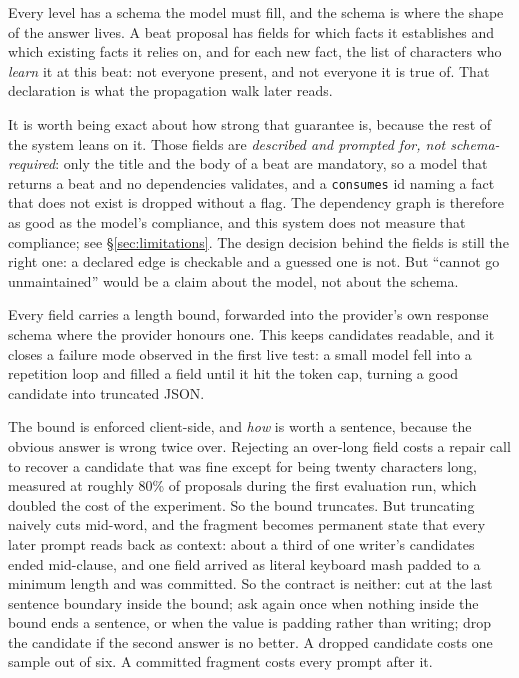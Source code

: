 \documentclass{article}
\begin{document}
Every level has a schema the model must fill, and the schema is where the shape of the
answer lives. A beat proposal has fields for which facts it establishes and which existing
facts it relies on, and for each new fact, the list of characters who \emph{learn} it at
this beat: not everyone present, and not everyone it is true of. That declaration is what
the propagation walk later reads.

It is worth being exact about how strong that guarantee is, because the rest of the system
leans on it. Those fields are \emph{described and prompted for, not schema-required}: only
the title and the body of a beat are mandatory, so a model that returns a beat and no
dependencies validates, and a \texttt{consumes} id naming a fact that does not exist is
dropped without a flag. The dependency graph is therefore as good as the model's
compliance, and this system does not measure that compliance; see
\S\ref{sec:limitations}. The design decision behind the fields is still the right one: a
declared edge is checkable and a guessed one is not. But ``cannot go unmaintained'' would
be a claim about the model, not about the schema.

Every field carries a length bound, forwarded into the provider's own response schema where
the provider honours one. This keeps candidates readable, and it closes a failure mode
observed in the first live test: a small model fell into a repetition loop and filled a
field until it hit the token cap, turning a good candidate into truncated JSON.

The bound is enforced client-side, and \emph{how} is worth a sentence, because the obvious
answer is wrong twice over. Rejecting an over-long field costs a repair call to recover a
candidate that was fine except for being twenty characters long, measured at roughly 80\%
of proposals during the first evaluation run, which doubled the cost of the experiment. So
the bound truncates. But truncating naively cuts mid-word, and the fragment becomes permanent
state that every later prompt reads back as context: about a third of one writer's candidates
ended mid-clause, and one field arrived as literal keyboard mash padded to a minimum length
and was committed. So the contract is neither: cut at the last sentence boundary inside the
bound; ask again once when nothing inside the bound ends a sentence, or when the value is
padding rather than writing; drop the candidate if the second answer is no better. A dropped
candidate costs one sample out of six. A committed fragment costs every prompt after it.
\end{document}
